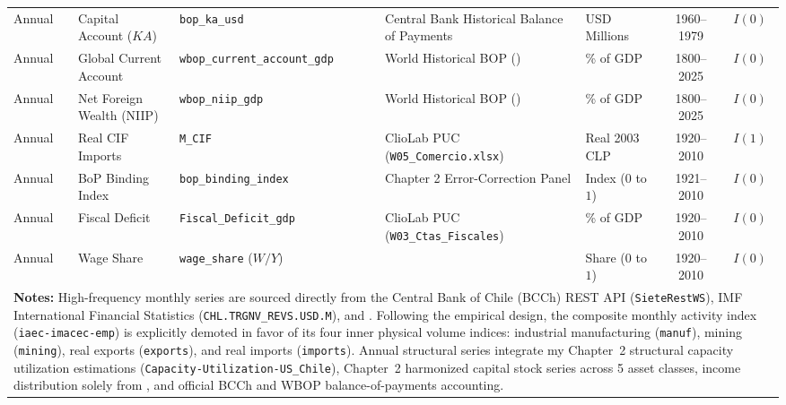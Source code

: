 \begin{table}[htbp]
{\begin{tabular}{lllllcc}
Annual & Capital Account ($KA$) & \texttt{bop\_ka\_usd} & Central Bank Historical Balance of Payments & USD Millions & 1960--1979 & $I(0)$ \\
Annual & Global Current Account & \texttt{wbop\_current\_account\_gdp} & World Historical BOP (\citealt{NievasPiketty2025}) & \% of GDP & 1800--2025 & $I(0)$ \\
Annual & Net Foreign Wealth (NIIP) & \texttt{wbop\_niip\_gdp} & World Historical BOP (\citealt{NievasPiketty2025}) & \% of GDP & 1800--2025 & $I(0)$ \\
Annual & Real CIF Imports & \texttt{M\_CIF} & ClioLab PUC (\texttt{W05\_Comercio.xlsx}) & Real 2003 CLP & 1920--2010 & $I(1)$ \\
Annual & BoP Binding Index & \texttt{bop\_binding\_index} & Chapter 2 Error-Correction Panel & Index ($0$ to $1$) & 1921--2010 & $I(0)$ \\
Annual & Fiscal Deficit & \texttt{Fiscal\_Deficit\_gdp} & ClioLab PUC (\texttt{W03\_Ctas\_Fiscales}) & \% of GDP & 1920--2010 & $I(0)$ \\
Annual & Wage Share & \texttt{wage\_share} ($W/Y$) & \citet{Astorga2023} & Share ($0$ to $1$) & 1920--2010 & $I(0)$ \\
\bottomrule
\multicolumn{7}{p{16.5cm}}{\footnotesize \textbf{Notes:} High-frequency monthly series are sourced directly from the Central Bank of Chile (BCCh) REST API (\texttt{SieteRestWS}), IMF International Financial Statistics (\texttt{CHL.TRGNV\_REVS.USD.M}), and \citet{DiazBahamonde2023}. Following the empirical design, the composite monthly activity index (\texttt{iaec-imacec-emp}) is explicitly demoted in favor of its four inner physical volume indices: industrial manufacturing (\texttt{manuf}), mining (\texttt{mining}), real exports (\texttt{exports}), and real imports (\texttt{imports}). Annual structural series integrate my Chapter~2 structural capacity utilization estimations (\texttt{Capacity-Utilization-US\_Chile}), Chapter~2 harmonized capital stock series across 5 asset classes, income distribution solely from \citet{Astorga2023}, and official BCCh and WBOP balance-of-payments accounting.} \\
\end{tabular}%
}
\end{table}
